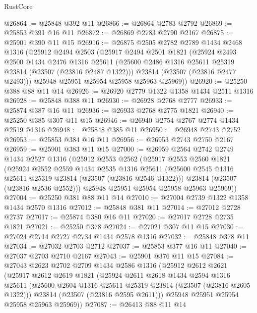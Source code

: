 \begin{lexlean}{RustCore}
\begin{coremodule}
@26864 := @25848 @392 @11
@26866 := @26864 @2783 @2792
@26869 := @25853 @391 @16 @11
@26872 := @26869 @2783 @2790 @2167
@26875 := @25901 @390 @11 @15
@26916 := @26875
    @2505
    @2782
    @2789
    @1434
    @2468
    @1316
    (@25912
      @2494
      @2503
      (@25917
        @2494
        @2501
        @1821
        (@25924
          @2493
          @2500
          @1434
          @2476
          @1316
          @25611
          (@25600 @2486 @1316 @25611 @25319 @23814 (@23507 (@23816 @2487 @1322)))
          @23814
          (@23507 (@23816 @2477 @2493)))
        @25948
        @25951
        @25954
        @25958
        @25963
        @25969))
@26920 := @25250 @388 @88 @11 @14
@26926 := @26920 @2779 @1322 @1358 @1434 @2511 @1316
@26928 := @25848 @388 @11
@26930 := @26928 @2768 @2777
@26933 := @25874 @387 @16 @11
@26936 := @26933 @2768 @2775 @1821
@26940 := @25250 @385 @307 @11 @15
@26946 := @26940 @2754 @2767 @2774 @1434 @2519 @1316
@26948 := @25848 @385 @11
@26950 := @26948 @2743 @2752
@26953 := @25853 @384 @16 @11
@26956 := @26953 @2743 @2750 @2167
@26959 := @25901 @383 @11 @15
@27000 := @26959
    @2564
    @2742
    @2749
    @1434
    @2527
    @1316
    (@25912
      @2553
      @2562
      (@25917
        @2553
        @2560
        @1821
        (@25924
          @2552
          @2559
          @1434
          @2535
          @1316
          @25611
          (@25600 @2545 @1316 @25611 @25319 @23814 (@23507 (@23816 @2546 @1322)))
          @23814
          (@23507 (@23816 @2536 @2552)))
        @25948
        @25951
        @25954
        @25958
        @25963
        @25969))
@27004 := @25250 @381 @88 @11 @14
@27010 := @27004 @2739 @1322 @1358 @1434 @2570 @1316
@27012 := @25848 @381 @11
@27014 := @27012 @2728 @2737
@27017 := @25874 @380 @16 @11
@27020 := @27017 @2728 @2735 @1821
@27021 := @25250 @378
@27024 := @27021 @307 @11 @15
@27030 := @27024 @2714 @2727 @2734 @1434 @2578 @1316
@27032 := @25848 @378 @11
@27034 := @27032 @2703 @2712
@27037 := @25853 @377 @16 @11
@27040 := @27037 @2703 @2710 @2167
@27043 := @25901 @376 @11 @15
@27084 := @27043
    @2623
    @2702
    @2709
    @1434
    @2586
    @1316
    (@25912
      @2612
      @2621
      (@25917
        @2612
        @2619
        @1821
        (@25924
          @2611
          @2618
          @1434
          @2594
          @1316
          @25611
          (@25600 @2604 @1316 @25611 @25319 @23814 (@23507 (@23816 @2605 @1322)))
          @23814
          (@23507 (@23816 @2595 @2611)))
        @25948
        @25951
        @25954
        @25958
        @25963
        @25969))
@27087 := @26413 @88 @11 @14

\end{coremodule}
\end{lexlean}
